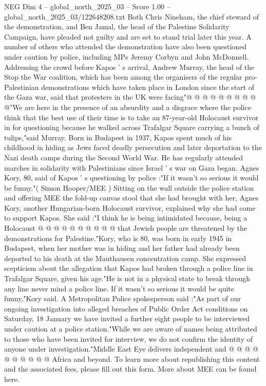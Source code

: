 \begin{textsample}{NEG Dim 4 – global\_north\_2025\_03 – Score 1.00 – global\_north\_2025\_03/122648208.txt}
Both Chris Nineham, the chief steward of the demonstration, and Ben Jamal, the head of the Palestine Solidarity Campaign, have pleaded not guilty and are set to stand trial later this year.
A number of others who attended the demonstration have also been questioned under caution by police, including MPs Jeremy Corbyn and John McDonnell.
Addressing the crowd before Kapos ' s arrival, Andrew Murray, the head of the Stop the War coalition, which has been among the organisers of the regular pro-Palestinian demonstrations which have taken place in London since the start of the Gaza war, said that protesters in the UK were facing"@ @ @ @ @ @ @ @ @ @"We are here in the presence of an absurdity and a disgrace where the police think that the best use of their time is to take an 87-year-old Holocaust survivor in for questioning because he walked across Trafalgar Square carrying a bunch of tulips,"said Murray.
Born in Budapest in 1937, Kapos spent much of his childhood in hiding as Jews faced deadly persecution and later deportation to the Nazi death camps during the Second World War.
He has regularly attended marches in solidarity with Palestinians since Israel ' s war on Gaza began.
Agnes Kory, 80, said of Kapos ' s questioning by police :"If it wasn't so serious it would be funny."( Simon Hooper/MEE ) Sitting on the wall outside the police station and offering MEE the fold-up canvas stool that she had brought with her, Agnes Kory, another Hungarian-born Holocaust survivor, explained why she had come to support Kapos.
She said :"I think he is being intimidated because, being a Holocaust @ @ @ @ @ @ @ @ @ @ that Jewish people are threatened by the demonstrations for Palestine."Kory, who is 80, was born in early 1945 in Budapest, when her mother was in hiding and her father had already been deported to his death at the Mauthausen concentration camp.
She expressed scepticism about the allegation that Kapos had broken through a police line in Trafalgar Square, given his age."He is not in a physical state to break through any line never mind a police line.
If it wasn't so serious it would be quite funny,"Kory said.
A Metropolitan Police spokesperson said :"As part of our ongoing investigation into alleged breaches of Public Order Act conditions on Saturday, 18 January we have invited a further eight people to be interviewed under caution at a police station."While we are aware of names being attributed to those who have been invited for interview, we do not confirm the identity of anyone under investigation."Middle East Eye delivers independent and @ @ @ @ @ @ @ @ @ @ Africa and beyond.
To learn more about republishing this content and the associated fees, please fill out this form.
More about MEE can be found here.

\end{textsample}
